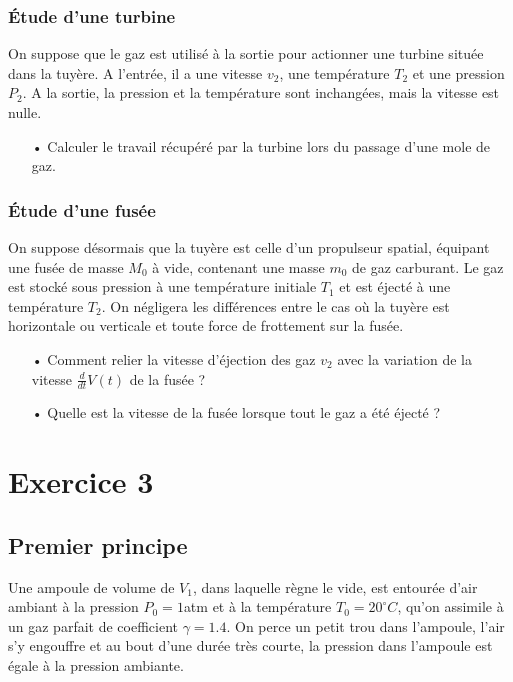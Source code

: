 \documentclass{report}
\begin{document}
\subsubsection*{Étude d'une turbine}
On suppose que le gaz est utilisé à la sortie pour actionner une turbine située dans la tuyère. A l'entrée, il a une vitesse $v_{2}$, une température $T_{2}$ et une pression $P_{2}$. A la sortie, la pression et la température sont inchangées, mais la vitesse est nulle. 
\begin{itemize}
\item[•] Calculer le travail récupéré par la turbine lors du passage d'une mole de gaz.

\end{itemize}

\subsubsection*{Étude d'une fusée}

On suppose désormais que la tuyère est celle d'un propulseur spatial, équipant une fusée de masse $M_0$ à vide, contenant une masse $m_0$ de gaz carburant. Le gaz est stocké sous pression à une température initiale $T_1$ et est éjecté à une température $T_2$. On négligera les différences entre le cas où la tuyère est horizontale ou verticale et toute force de frottement sur la fusée. 

\begin{itemize}
	\item[•] Comment relier la vitesse d'éjection des gaz $v_2$ avec la variation de la vitesse $\frac{d}{dt} V(t)$ de la fusée ? 
	\item[•] Quelle est la vitesse de la fusée lorsque tout le gaz a été éjecté ?
\end{itemize}

\newpage

\section*{Exercice 3}

\subsection*{Premier principe}

Une ampoule de volume de $V_1$, dans laquelle règne le vide, est entourée d'air ambiant à la pression $P_{0} = 1$atm et à la température $T_{0}=20^{\circ}C$, qu'on assimile à un gaz parfait de coefficient $\gamma=1.4$. On perce un petit trou dans l'ampoule, l'air s'y engouffre et au bout d'une durée très courte, la pression dans l'ampoule est égale à la pression ambiante.
\end{document}
